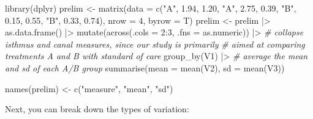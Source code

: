 \documentclass[
]{book}
\newenvironment{Shaded}{\begin{snugshade}}{\end{snugshade}}
\newcommand{\AttributeTok}[1]{\textcolor[rgb]{0.77,0.63,0.00}{#1}}
\newcommand{\CommentTok}[1]{\textcolor[rgb]{0.56,0.35,0.01}{\textit{#1}}}
\newcommand{\DecValTok}[1]{\textcolor[rgb]{0.00,0.00,0.81}{#1}}
\newcommand{\FloatTok}[1]{\textcolor[rgb]{0.00,0.00,0.81}{#1}}
\newcommand{\FunctionTok}[1]{\textcolor[rgb]{0.00,0.00,0.00}{#1}}
\newcommand{\NormalTok}[1]{#1}
\newcommand{\OtherTok}[1]{\textcolor[rgb]{0.56,0.35,0.01}{#1}}
\newcommand{\SpecialCharTok}[1]{\textcolor[rgb]{0.00,0.00,0.00}{#1}}
\newcommand{\StringTok}[1]{\textcolor[rgb]{0.31,0.60,0.02}{#1}}
\begin{document}
\begin{Shaded}
\begin{Highlighting}[]
\FunctionTok{library}\NormalTok{(dplyr)}
\NormalTok{prelim }\OtherTok{\textless{}{-}} \FunctionTok{matrix}\NormalTok{(}\AttributeTok{data =} \FunctionTok{c}\NormalTok{(}\StringTok{"A"}\NormalTok{, }\FloatTok{1.94}\NormalTok{, }\FloatTok{1.20}\NormalTok{,}
                             \StringTok{"A"}\NormalTok{, }\FloatTok{2.75}\NormalTok{, }\FloatTok{0.39}\NormalTok{,}
                             \StringTok{"B"}\NormalTok{, }\FloatTok{0.15}\NormalTok{, }\FloatTok{0.55}\NormalTok{,}
                             \StringTok{"B"}\NormalTok{, }\FloatTok{0.33}\NormalTok{, }\FloatTok{0.74}\NormalTok{),}
                    \AttributeTok{nrow =} \DecValTok{4}\NormalTok{,}
                    \AttributeTok{byrow =}\NormalTok{ T)}
\NormalTok{prelim }\OtherTok{\textless{}{-}}\NormalTok{ prelim }\SpecialCharTok{|\textgreater{}} 
  \FunctionTok{as.data.frame}\NormalTok{() }\SpecialCharTok{|\textgreater{}}
  \FunctionTok{mutate}\NormalTok{(}\FunctionTok{across}\NormalTok{(}\AttributeTok{.cols =} \DecValTok{2}\SpecialCharTok{:}\DecValTok{3}\NormalTok{, }\AttributeTok{.fns =}\NormalTok{ as.numeric)) }\SpecialCharTok{|\textgreater{}}
  \CommentTok{\# collapse isthmus and canal measures, since our study is primarily }
  \CommentTok{\# aimed at comparing treatments A and B with standard of care }
  \FunctionTok{group\_by}\NormalTok{(V1) }\SpecialCharTok{|\textgreater{}} 
  \CommentTok{\# average the mean and sd of each A/B group }
  \FunctionTok{summarise}\NormalTok{(}\AttributeTok{mean =} \FunctionTok{mean}\NormalTok{(V2),}
            \AttributeTok{sd =} \FunctionTok{mean}\NormalTok{(V3))}

\FunctionTok{names}\NormalTok{(prelim) }\OtherTok{\textless{}{-}} \FunctionTok{c}\NormalTok{(}\StringTok{"measure"}\NormalTok{, }\StringTok{"mean"}\NormalTok{, }\StringTok{"sd"}\NormalTok{)}
\end{Highlighting}
\end{Shaded}

Next, you can break down the types of variation:

\begin{Shaded}
\end{Shaded}
\end{document}
